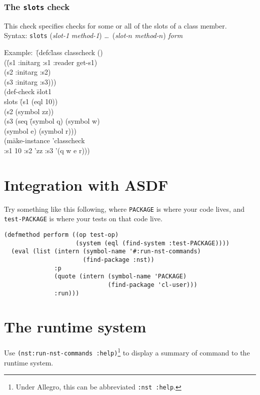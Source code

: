 \documentclass{article}
\begin{document}
\subsubsection{The \texttt{slots} check} 
This check specifies checks for some or all of the slots of a class
member.
\\ Syntax: \texttt{slots} (\textit{slot-1} \textit{method-1})  \ldots\ (\textit{slot-$n$} \textit{method-$n$}) \textit{form}
{\ttfamily\begin{tabbing}
\textrm{Example:}\ \= (defc\=lass classcheck ()
\\ \> \> (\=(s1 :initarg :s1 :reader get-s1)
\\ \> \> \> (s2 :initarg :s2)
\\ \> \> \> (s3 :initarg :s3)))
\\ \> (def-check \=slot1
\\ \> \>  slots \=(s1 (eql 10))
\\ \> \>  \>(s2 (symbol zz))
\\ \> \>  \>(s3 (seq \=(symbol q) (symbol w)
\\ \> \>  \> \> (symbol e) (symbol r)))
\\ \> \>  (m\=ake-instance 'classcheck
\\ \> \> \>  :s1 10 :s2 'zz :s3 '(q w e r)))
\end{tabbing}}

\section{Integration with ASDF}
Try something like this following, where \texttt{PACKAGE} is where
your code lives, and \texttt{test-PACKAGE} is where your tests on that
code live.
\begin{verbatim}
(defmethod perform ((op test-op)
                    (system (eql (find-system :test-PACKAGE))))
  (eval (list (intern (symbol-name '#:run-nst-commands)
                      (find-package :nst))
              :p
              (quote (intern (symbol-name 'PACKAGE)
                             (find-package 'cl-user)))
              :run)))
\end{verbatim}

\section{The runtime system}
Use \texttt{(nst:run-nst-commands :help)}\footnote{Under Allegro, this
  can be abbreviated \texttt{:nst :help}\enspace.} to display a
summary of command to the runtime system.
\end{document}
